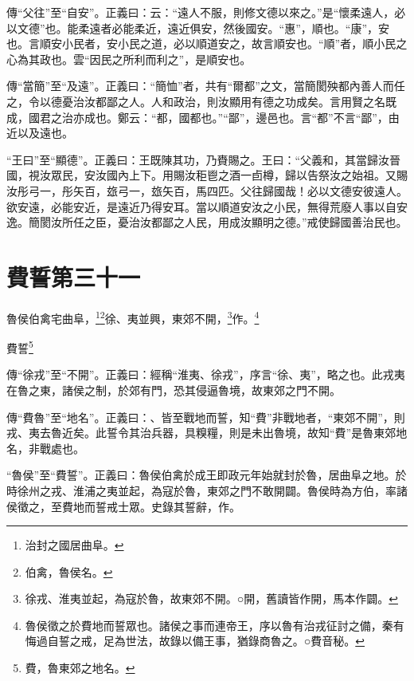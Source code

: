 {\noindent\zhuan{}\fzbyks 傳“父往”至“自安”。正義曰：云：“遠人不服，則修文德以來之。”是“懷柔遠人，必以文德”也。能柔遠者必能柔近，遠近俱安，然後國安。“惠”，順也。“康”，安也。言順安小民者，安小民之道，必以順道安之，故言順安也。“順”者，順小民之心為其政也。雲“因民之所利而利之”，是順安也。 \par}

{\noindent\zhuan{}\fzbyks 傳“當簡”至“及遠”。正義曰：“簡恤”者，共有“爾都”之文，當簡閡殃都內善人而任之，令以德憂治汝都鄙之人。人和政治，則汝顯用有德之功成矣。言用賢之名既成，國君之治亦成也。鄭云：“都，國都也。”“鄙”，邊邑也。言“都”不言“鄙”，由近以及遠也。 \par}

{\noindent\shu{}\fzkt “王曰”至“顯德”。正義曰：王既陳其功，乃賚賜之。王曰：“父義和，其當歸汝晉國，視汝眾民，安汝國內上下。用賜汝秬鬯之酒一卣樽，歸以告祭汝之始祖。又賜汝彤弓一，彤矢百，玈弓一，玈矢百，馬四匹。父往歸國哉！必以文德安彼遠人。欲安遠，必能安近，是遠近乃得安耳。當以順道安汝之小民，無得荒廢人事以自安逸。簡閡汝所任之臣，憂治汝都鄙之人民，用成汝顯明之德。”戒使歸國善治民也。 \par}

\section{費誓第三十一}


魯侯伯禽宅曲阜，\footnote{治封之國居曲阜。}\footnote{伯禽，魯侯名。}徐、夷並興，東郊不開，\footnote{徐戎、淮夷並起，為寇於魯，故東郊不開。○開，舊讀皆作開，馬本作闢。}作。\footnote{魯侯徵之於費地而誓眾也。諸侯之事而連帝王，序以魯有治戎征討之備，秦有悔過自誓之戒，足為世法，故錄以備王事，猶錄商魯之。○費音秘。}

費誓\footnote{費，魯東郊之地名。}


{\noindent\zhuan{}\fzbyks 傳“徐戎”至“不開”。正義曰：經稱“淮夷、徐戎”，序言“徐、夷”，略之也。此戎夷在魯之東，諸侯之制，於郊有門，恐其侵逼魯境，故東郊之門不開。 \par}

{\noindent\zhuan{}\fzbyks 傳“費魯”至“地名”。正義曰：、皆至戰地而誓，知“費”非戰地者，“東郊不開”，則戎、夷去魯近矣。此誓令其治兵器，具糗糧，則是未出魯境，故知“費”是魯東郊地名，非戰處也。 \par}

{\noindent\shu{}\fzkt “魯侯”至“費誓”。正義曰：魯侯伯禽於成王即政元年始就封於魯，居曲阜之地。於時徐州之戎、淮浦之夷並起，為寇於魯，東郊之門不敢開闢。魯侯時為方伯，率諸侯徵之，至費地而誓戒士眾。史錄其誓辭，作。 \par}

